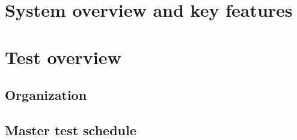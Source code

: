\section{System overview and key features} \label{s:introduction:system-overview-and-key-features}
	\begin{comment}
		$<$Describe the mission or business purpose of the system or software product under test (or reference where the information can be found, e.g., in a system definition document, such as a Concept of
		Operations). Describe the key features of the system or software under test [or reference where the information can be found, e.g., in a requirements document or COTS documentation]. $>$
	\end{comment}
	
\section{Test overview} \label{s:introduction:test-overview}
	\begin{comment}
		$<$Describe the test organization, test schedule, integrity level scheme, test resources, responsibilities, tools, techniques, and methods necessary to perform the testing. $>$
	\end{comment}

\subsection{Organization} \label{s:introduction:organization}
	\begin{comment}
		$<$Describe the relationship of the test processes to other processes such as development, project
		management, quality assurance, and configuration management. Include the lines of communication
		within the testing organization(s), the authority for resolving issues raised by the testing tasks, and the authority for approving test products and processes. This may include (but should not be limited to) a visual representation, e.g., an organization chart. $>$
	\end{comment}

\subsection{Master test schedule} \label{s:introduction:master-test-schedule}
	\begin{comment}
		$<$Describe the test activities within the project life cycle and milestones. Summarize the overall schedule of the testing tasks, identifying where task results feed back to the development, organizational, and supporting processes (e.g., quality assurance and configuration management). Describe the task iteration policy for the re-execution of test tasks and any dependencies. $>$
	\end{comment}

